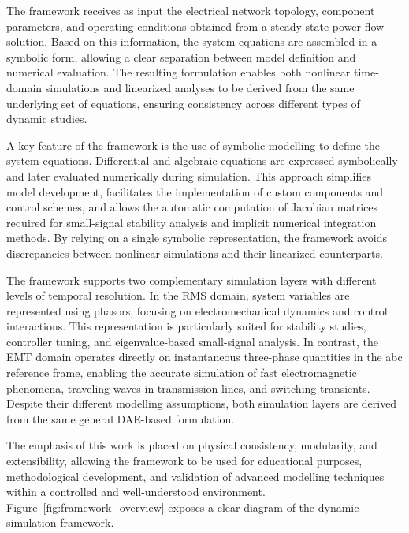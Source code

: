 The framework receives as input the electrical network
topology, component parameters, and operating conditions obtained from a steady-state
power flow solution. Based on this information, the system equations are assembled in a
symbolic form, allowing a clear separation between model definition and numerical
evaluation. The resulting formulation enables both nonlinear time-domain simulations and
linearized analyses to be derived from the same underlying set of equations, ensuring
consistency across different types of dynamic studies.

A key feature of the framework is the use of symbolic modelling to define the system
equations. Differential and algebraic equations are expressed symbolically and later
evaluated numerically during simulation. This approach simplifies model development,
facilitates the implementation of custom components and control schemes, and allows the
automatic computation of Jacobian matrices required for small-signal stability analysis and
implicit numerical integration methods. By relying on a single symbolic representation, the
framework avoids discrepancies between nonlinear simulations and their linearized
counterparts.

The framework supports two complementary simulation layers with different levels of
temporal resolution. In the RMS domain, system variables are represented using phasors,
focusing on electromechanical dynamics and control interactions. This representation is particularly suited
for stability studies, controller tuning, and eigenvalue-based small-signal analysis. In
contrast, the EMT domain operates directly on instantaneous three-phase quantities in the
abc reference frame, enabling the accurate simulation of fast electromagnetic
phenomena, traveling waves in transmission lines, and switching transients. Despite their
different modelling assumptions, both simulation layers are derived from the same general
DAE-based formulation.

The emphasis of this work is placed on physical consistency, modularity, and
extensibility, allowing the framework to be used for educational purposes, methodological
development, and validation of advanced modelling techniques within a controlled and
well-understood environment. Figure~\ref{fig:framework_overview} exposes a clear diagram of the dynamic simulation framework.


